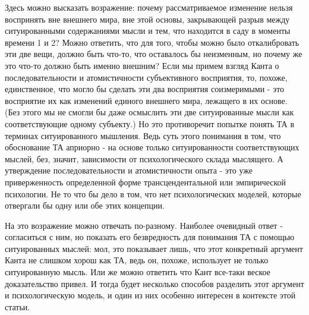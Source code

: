\documentclass{article}
\begin{document}
Здесь можно высказать возражение: почему рассматриваемое изменение нельзя воспринять вне внешнего мира, вне этой основы, закрывающей разрыв между ситуированными содержаниями мысли и тем, что находится в саду в моменты времени 1 и 2? Можно ответить, что для того, чтобы можно было откалибровать эти две вещи, должно быть что-то, что оставалось бы неизменным, но почему же это что-то должно быть именно внешним? Если мы примем взгляд Канта о последовательности и атомистичности субъективного восприятия, то, похоже, единственное, что могло бы сделать эти два восприятия соизмеримыми - это восприятие их как изменений единого внешнего мира, лежащего в их основе. (Без этого мы не смогли бы даже осмыслить эти две ситуированные мысли как соответствующие одному субъекту.) Но это противоречит попытке понять ТА в терминах ситуированного мышления. Ведь суть этого понимания в том, что обоснование ТА априорно - на основе только ситуированности соответствующих мыслей, без, значит, зависимости от психологического склада мыслящего. А утверждение последовательности и атомистичности опыта - это уже приверженность определенной форме трансцендентальной или эмпирической психологии. Не то что бы дело в том, что нет психологических моделей, которые отвергали бы одну или обе этих концепции.

На это возражение можно отвечать по-разному. Наиболее очевидный ответ - согласиться с ним, но показать его безвредность для понимания ТА с помощью ситуированных мыслей: мол, это показывает лишь, что этот конкретный аргумент Канта не слишком хорош как ТА, ведь он, похоже, использует не только ситуированную мысль. Или же можно ответить что Кант все-таки веское доказательство привел. И тогда будет несколько способов разделить этот аргумент и психологическую модель, и один из них особенно интересен в контексте этой статьи.
\end{document}
